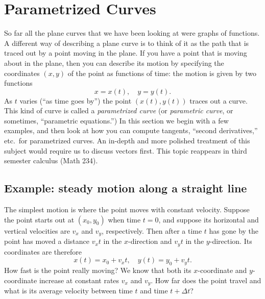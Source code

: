 \section{Parametrized Curves}
\label{sec:05parametrized-curves-and-lHopital}
So far all the plane curves that we have been looking at were graphs of
functions.  A different way of describing a plane curve is to think of it as the
path that is traced out by a point moving in the plane.  If you have a point
that is moving about in the plane, then you can describe its motion by
specifying the coordinates $(x, y)$ of the point as functions of time: the
motion is given by two functions
\[
x = x(t), \quad y=y(t).
\]%
\marginpar{ }%
As $t$ varies (``as time goes by'') the point $(x(t), y(t))$ traces out a curve.
This kind of curve is called a \emph{parametrized curve} (or \textit{parametric
  curve}, or sometimes, ``parametric equations.'')  In this section we begin
with a few examples, and then look at how you can compute tangents, ``second
derivatives,'' etc.~for parametrized curves.  An in-depth and more polished
treatment of this subject would require us to discuss vectors first.  This topic
reappears in third semester calculus (Math 234).

\subsection{Example: steady motion along a straight line}
The simplest motion is where the point moves with constant velocity.
Suppose the point starts out at $(x_0, y_0)$ when time $t=0$, and
suppose its horizontal and vertical velocities are $v_x$ and $v_y$,
respectively.  Then after a time $t$ has gone by the point has moved a
distance $v_x t$ in the $x$-direction and $v_y t$ in the
$y$-direction.  Its coordinates are therefore
\begin{equation}
  x(t) = x_0 + v_x t, \quad 
  y(t) = y_0 + v_y t.
  \label{eq:05motion-on-line}
\end{equation}
How fast is the point really moving?  We know that both its $x$-coordinate and
$y$-coordinate increase at constant rates $v_x$ and $v_y$.  How far does the
point travel and what is its average velocity between time $t$ and time
$t+\Delta t$?


